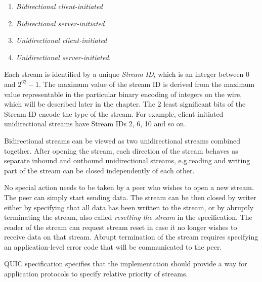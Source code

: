 \begin{enumerate}

  \item \textit{Bidirectional client-initiated}
  \item \textit{Bidirectional server-initiated}
  \item \textit{Unidirectional client-initiated}
  \item \textit{Unidirectional server-initiated}.

\end{enumerate}

Each stream is identified by a unique \textit{Stream ID}, which is an integer between 0 and
$2^{62}-1$.   The maximum value of the stream ID is derived from the maximum value representable in
the particular binary encoding of integers on the wire, which will be described later in the
chapter.  The 2 least significant bits of the Stream ID encode the type of the stream. For example,
client initiated unidirectional streams have Stream IDs 2, 6, 10 and so on.

Bidirectional streams can be viewed as two unidirectional streams combined together. After opening
the stream, each direction of the stream behaves as separate inbound and outbound unidirectional
streams, e.g.\@the reading and writing part of the stream can be closed independently of each other.

No special action needs to be taken by a peer who wishes to open a new stream. The peer can simply
start sending data. The stream can be then closed by writer either by specifying that all data has
been written to the stream, or by abruptly terminating the stream, also called \textit{resetting the
stream} in the specification. The reader of the stream can request stream reset in case it no longer
wishes to receive data on that stream. Abrupt termination of the stream requires specifying an
application-level error code that will be communicated to the peer.

QUIC specification specifies that the implementation should provide a way for application protocols
to specify relative priority of streams. 

